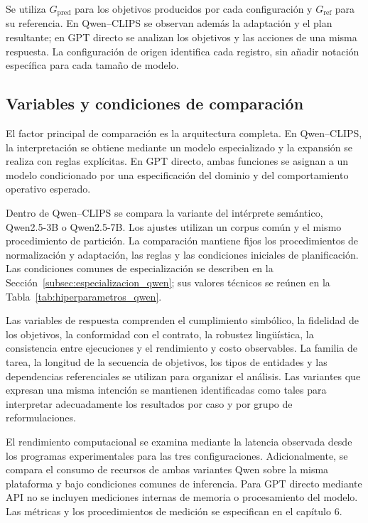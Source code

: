 Se utiliza $G_{\mathrm{pred}}$ para los objetivos producidos por cada configuración y $G_{\mathrm{ref}}$ para su referencia. En Qwen--CLIPS se observan además la adaptación y el plan resultante; en GPT directo se analizan los objetivos y las acciones de una misma respuesta. La configuración de origen identifica cada registro, sin añadir notación específica para cada tamaño de modelo.

\subsection{Variables y condiciones de comparación}

El factor principal de comparación es la arquitectura completa. En
Qwen--CLIPS, la interpretación se obtiene mediante un modelo especializado
y la expansión se realiza con reglas explícitas. En GPT directo, ambas
funciones se asignan a un modelo condicionado por una especificación del
dominio y del comportamiento operativo esperado.

Dentro de Qwen--CLIPS se compara la variante del intérprete semántico, Qwen2.5-3B o Qwen2.5-7B. Los ajustes utilizan un corpus común y el mismo procedimiento de partición. La comparación mantiene fijos los procedimientos de normalización y adaptación, las reglas y las condiciones iniciales de planificación. Las condiciones comunes de especialización se describen en la Sección~\ref{subsec:especializacion_qwen}; sus valores técnicos se reúnen en la Tabla~\ref{tab:hiperparametros_qwen}.

Las variables de respuesta comprenden el cumplimiento simbólico, la fidelidad de los objetivos, la conformidad con el contrato, la robustez lingüística, la consistencia entre ejecuciones y el rendimiento y costo observables. La familia
de tarea, la longitud de la secuencia de objetivos, los tipos de entidades
y las dependencias referenciales se utilizan para organizar el análisis.
Las variantes que expresan una misma intención se mantienen identificadas
como tales para interpretar adecuadamente los resultados por caso y por
grupo de reformulaciones.

El rendimiento computacional se examina mediante la latencia observada
desde los programas experimentales para las tres configuraciones.
Adicionalmente, se compara el consumo de recursos de ambas variantes
Qwen sobre la misma plataforma y bajo condiciones comunes de
inferencia. Para GPT directo mediante API no se incluyen mediciones
internas de memoria o procesamiento del modelo. Las métricas y los
procedimientos de medición se especifican en el capítulo 6.


